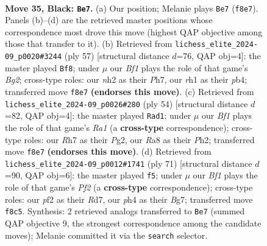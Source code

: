 \documentclass[11pt]{article}
\begin{document}
\clearpage

\begin{figure}[p]\centering
\begin{subfigure}{0.46\textwidth}\centering
\resizebox{\linewidth}{!}{%
\newchessgame
\chessboard[
  setfen={rk3b2/1p4pr/p1p1b2p/P4p2/2pP3P/2B1P3/1P3PPN/R1K4R b - - 5 35},
  showmover=false,
  pgfstyle=straightmove, color=movearrow, markmove={f8-e7}
]}
\caption{}
\end{subfigure}\hfill
\begin{subfigure}{0.46\textwidth}\centering
\resizebox{\linewidth}{!}{%
\newchessgame
\chessboard[
  setfen={2r3k1/1pr2pbp/p3p1p1/P7/1P1pP3/N2P1P1P/R3K1P1/3R4 b - - 5 29},
  showmover=false,
  pgfstyle=straightmove, color=movearrow, markmove={g7-f8}
]}
\caption{}
\end{subfigure}
\\[4pt]
\begin{subfigure}{0.46\textwidth}\centering
\resizebox{\linewidth}{!}{%
\newchessgame
\chessboard[
  setfen={1rb1k2r/5p2/p2Rp2p/4P1p1/P3B3/1pP5/1P3PPP/R5K1 w - - 1 28},
  showmover=false,
  pgfstyle=straightmove, color=movearrow, markmove={a1-d1}
]}
\caption{}
\end{subfigure}\hfill
\begin{subfigure}{0.46\textwidth}\centering
\resizebox{\linewidth}{!}{%
\newchessgame
\chessboard[
  setfen={6k1/3r1pb1/1p1p2p1/p2Pp3/P1P5/1P1R3P/2n2P2/2B2BK1 b - - 4 36},
  showmover=false,
  pgfstyle=straightmove, color=movearrow, markmove={f7-f5}
]}
\caption{}
\end{subfigure}
\caption{\textbf{Move 35, Black: \texttt{Be7}.} (a) Our position; Melanie plays \texttt{Be7} (\texttt{f8e7}). Panels (b)--(d) are the retrieved master positions whose correspondence most drove this move (highest QAP objective among those that transfer to it). (b) Retrieved from \texttt{lichess\_elite\_2024-09\_p0020\#3244} (ply 57) [structural distance $d$=76, QAP obj=4]: the master played \texttt{Bf8}; under $\mu$ our \emph{Bf1} plays the role of that game's \emph{Bg2}; cross-type roles: our \emph{n}h2 as their \emph{P}h7, our \emph{r}h1 as their \emph{p}b4; transferred move \texttt{f8e7} \textbf{(endorses this move)}. (c) Retrieved from \texttt{lichess\_elite\_2024-09\_p0026\#280} (ply 54) [structural distance $d$=82, QAP obj=4]: the master played \texttt{Rad1}; under $\mu$ our \emph{Bf1} plays the role of that game's \emph{Ra1} (a \textbf{cross-type} correspondence); cross-type roles: our \emph{R}h7 as their \emph{P}g2, our \emph{R}a8 as their \emph{P}h2; transferred move \texttt{f8e7} \textbf{(endorses this move)}. (d) Retrieved from \texttt{lichess\_elite\_2024-09\_p0012\#1741} (ply 71) [structural distance $d$=90, QAP obj=6]: the master played \texttt{f5}; under $\mu$ our \emph{Bf1} plays the role of that game's \emph{Pf2} (a \textbf{cross-type} correspondence); cross-type roles: our \emph{p}f2 as their \emph{R}d7, our \emph{p}h4 as their \emph{B}g7; transferred move \texttt{f8c5}. Synthesis: 2 retrieved analogs transferred to \texttt{Be7} (summed QAP objective 9, the strongest correspondence among the candidate moves); Melanie committed it via the \texttt{search} selector.}
\label{fig:thought-m69}
\end{figure}
\end{document}
